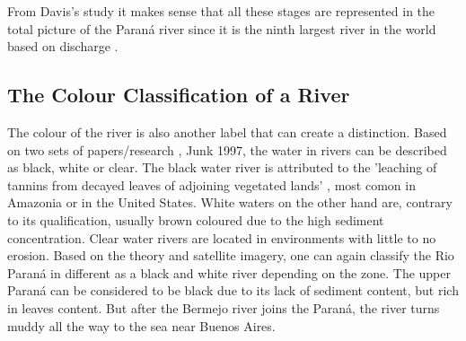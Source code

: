 From Davis's study it makes sense that all these stages are represented in the total picture of the Paraná river since it is the ninth largest river in the world based on discharge \autocite{lopezweibelSourcesTemporalDynamics2022}.

\subsection{The Colour Classification of a River}
The colour of the river is also another label that can create a distinction. Based on two sets of papers/research  \autocite{furchWaterChemistryAmazon1984}, \autocite{sioliAmazonLimnologyLandscape1984}  Junk 1997, the water in rivers can be described as black, white or clear. The black water river is attributed to the 'leaching of tannins from decayed leaves of adjoining vegetated lands' \autocite{sand-mining-boek}, most comon in Amazonia or in the United States. White waters on the other hand are, contrary to its qualification, usually brown coloured due to the high sediment concentration. Clear water rivers are located in environments with little to no erosion.
Based on the theory and satellite imagery, one can again classify the Rio Paraná in different as a black and white river depending on the zone. The upper Paraná can be considered to be black due to its lack of sediment content, but rich in leaves content. But after the Bermejo river joins the Paraná, the river turns muddy all the way to the sea near Buenos Aires. \autocite{lopezweibelSourcesTemporalDynamics2022}

